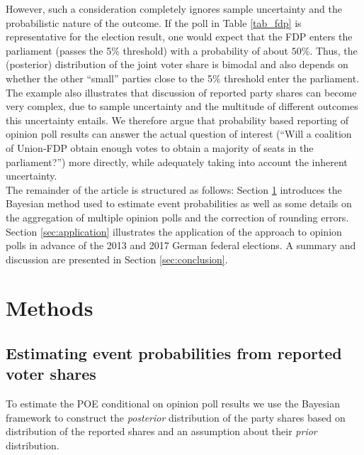 \documentclass[smallcondensed]{svjour3}     %
\begin{document}
However, such a consideration completely ignores sample uncertainty and the
probabilistic nature of the outcome. If the poll in Table \ref{tab_fdp} is representative for the election result, one would expect that the FDP enters the parliament (passes the 5\% threshold) with a
probability of about $50\%$. Thus, the (posterior) distribution of the joint voter
share is bimodal and also depends on whether the other ``small'' parties close to
the 5\% threshold enter the parliament. The example also illustrates that discussion
of reported party shares can become very complex, due to sample uncertainty
and the multitude of different outcomes this uncertainty entails.
We therefore argue that probability based reporting of opinion poll results can
answer the actual question of interest (``Will a coalition of Union-FDP obtain
enough votes to obtain a majority of seats in the parliament?'') more directly, while
adequately taking into account the inherent uncertainty.\\

The remainder of the article is structured as follows: Section \ref{sec:methods}
introduces the Bayesian method used to estimate event probabilities as well
as some details on the aggregation of multiple opinion polls and the correction
of rounding errors. Section \ref{sec:application} illustrates the
application of the approach to opinion polls in advance of the  2013 and 2017
German federal elections. A summary and discussion are presented in Section
\ref{sec:conclusion}.\\

\section{Methods}\label{sec:methods}

\subsection{Estimating event probabilities from reported voter shares} \label{ssec:bayes}
To estimate the POE conditional on opinion poll results
we use the Bayesian framework to construct the \emph{posterior} distribution of
the party shares based on distribution of the reported shares and an assumption
about their \emph{prior} distribution.\\
\end{document}
